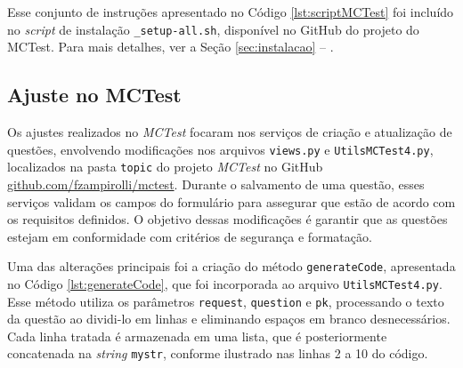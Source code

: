 Esse conjunto de instruções apresentado no Código \ref{lst:scriptMCTest} foi incluído no \textit{script} de instalação \texttt{\_setup-all.sh}, disponível no GitHub do projeto do MCTest. Para mais detalhes, ver a Seção \ref{sec:instalacao} -- .

\subsection{Ajuste no MCTest}\label{sec:contexto}

Os ajustes realizados no \textit{MCTest} focaram nos serviços de criação e atualização de questões, envolvendo modificações nos arquivos \texttt{views.py} e \texttt{UtilsMCTest4.py}, localizados na pasta \texttt{topic} do projeto \textit{MCTest} no GitHub \href{https://github.com/fzampirolli/mctest}{github.com/fzampirolli/mctest}. Durante o salvamento de uma questão, esses serviços validam os campos do formulário para assegurar que estão de acordo com os requisitos definidos. O objetivo dessas modificações é garantir que as questões estejam em conformidade com critérios de segurança e formatação.

Uma das alterações principais foi a criação do método \texttt{generateCode}, apresentada no Código \ref{lst:generateCode}, que foi incorporada ao arquivo \texttt{UtilsMCTest4.py}. Esse método utiliza os parâmetros \texttt{request}, \texttt{question} e \texttt{pk}, processando o texto da questão ao dividi-lo em linhas e eliminando espaços em branco desnecessários. Cada linha tratada é armazenada em uma lista, que é posteriormente concatenada na \textit{string} \texttt{mystr}, conforme ilustrado nas linhas 2 a 10 do código.

